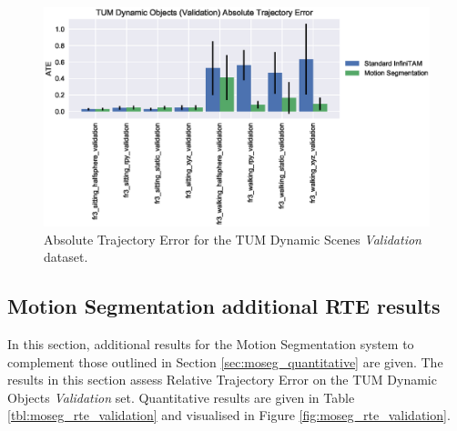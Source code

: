 \begin{figure}[h]
  \label{fig:moseg_ate_validation}
  \centering
  \includegraphics[width=\linewidth]{figures/moseg/ate_validation.eps}
  \caption{Absolute Trajectory Error for the TUM Dynamic Scenes
    \textit{Validation} dataset.}
\end{figure}

\subsection{Motion Segmentation additional RTE results}
In this section, additional results for the Motion Segmentation system
to complement those outlined in Section \ref{sec:moseg_quantitative} are given.
The results in this section assess Relative Trajectory Error on the TUM Dynamic
Objects \textit{Validation} set. Quantitative results are given in Table
\ref{tbl:moseg_rte_validation} and visualised in Figure
\ref{fig:moseg_rte_validation}.

